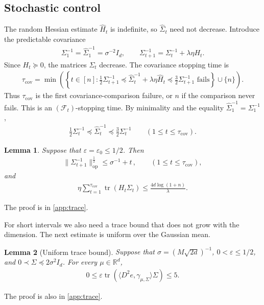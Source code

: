\documentclass[11pt]{article}
\newtheorem{lemma}[lemma]{Lemma}
\newcommand{\R}{\mathbb R}
\newcommand{\tr}{\operatorname{tr}}
\newcommand{\Lip}{\operatorname{Lip}}
\newcommand{\op}{\mathrm{op}}
\newcommand{\1}{\mathbf 1}
\newcommand{\eps}{\varepsilon}
\begin{document}
\subsection{Stochastic control}
\label{sec:stochastic-control}
The random Hessian estimate $\hat{H}_t$ is indefinite, so $\widehat\Sigma_t$ need not decrease.
Introduce the predictable covariance
\begin{align}
    \Sigma_1^{-1}=\widehat\Sigma_1^{-1} = \sigma^{-2}I_d,
    \qquad
    \Sigma_{t+1}^{-1}
    =\Sigma_t^{-1}+\lambda\eta H_t.
    \label{eq:predictable-covariance}
\end{align}
Since $H_t\succeq0$, the matrices $\Sigma_t$ decrease.
The covariance stopping time is
\begin{align}
    \tau_{\mathrm{cov}}
    =
    \min\left(
    \left\{
    t \in [n]:
    \frac12 \Sigma_{t+1}^{-1}
    \preceq
    \widehat\Sigma_t^{-1}+\lambda\eta\widehat H_t
    \preceq
    \frac32 \Sigma_{t+1}^{-1}
    \text{ fails}
    \right\}
    \cup\{n\}
    \right).
    \label{eq:covariance-stopping-time}
\end{align}
Thus $\tau_{\mathrm{cov}}$ is the first covariance-comparison failure, or $n$
if the comparison never fails.  This is an $(\mathcal F_t)$-stopping time.
By minimality and the equality $\widehat\Sigma_1^{-1}=\Sigma_1^{-1}$,
\begin{align}
    \frac12\Sigma_t^{-1}
    \preceq\widehat\Sigma_t^{-1}
    \preceq\frac32\Sigma_t^{-1}
    \qquad(1\leq t\leq\tau_{\mathrm{cov}}).
    \label{eq:covariance-comparison}
\end{align}
\begin{lemma}
    \label{lem:trace}
    Suppose that $\eps=\eps_0\leq1/2$. Then
    \begin{align}
        \|\Sigma_{t+1}^{-1}\|_{\op}^{\frac12}
        \leq
        \sigma^{-1}+t\,,
        \qquad(1\leq t\leq \tau_{\mathrm{cov}}),
        \label{eq:predictable-spectrum}
    \end{align}
    and
    \begin{align}
        \eta\sum_{t=1}^{\tau_{\mathrm{cov}}}
        \tr(H_t\Sigma_t)
        \leq\frac{4d\log(1 + n)}{\lambda}.
        \label{eq:trace-budget}
    \end{align}
\end{lemma}
The proof is in \cref{app:trace}.

For short intervals we also need a trace bound that does not grow with
the dimension. The next estimate is uniform over the Gaussian mean.
\begin{lemma}[Uniform trace bound]
    \label{lem:uniform-trace}
    Suppose that $\sigma=(M\sqrt{2d})^{-1}$, $0<\eps\leq1/2$, and
    $0\prec\Sigma\preceq2\sigma^2I_d$. For every $\mu\in\R^d$,
    \begin{align}
        0\leq\eps\tr\left(
        \langle D^2e,\gamma_{\mu,\Sigma}\rangle\Sigma
        \right)\leq5.
        \label{eq:uniform-trace}
    \end{align}
\end{lemma}
The proof is also in \cref{app:trace}.
\end{document}
